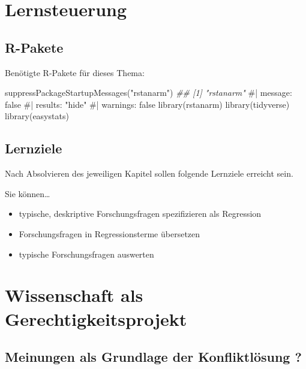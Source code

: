 \documentclass[
  a4paper,
  DIV=11]{scrreprt}
\newenvironment{Shaded}{\begin{snugshade}}{\end{snugshade}}
\newcommand{\CommentTok}[1]{\textcolor[rgb]{0.37,0.37,0.37}{#1}}
\newcommand{\DocumentationTok}[1]{\textcolor[rgb]{0.37,0.37,0.37}{\textit{#1}}}
\newcommand{\FunctionTok}[1]{\textcolor[rgb]{0.28,0.35,0.67}{#1}}
\newcommand{\NormalTok}[1]{\textcolor[rgb]{0.00,0.23,0.31}{#1}}
\newcommand{\StringTok}[1]{\textcolor[rgb]{0.13,0.47,0.30}{#1}}
\providecommand{\tightlist}{%
  \setlength{\itemsep}{0pt}\setlength{\parskip}{0pt}}\usepackage{longtable,booktabs,array}
\theoremstyle{definition}
\theoremstyle{remark}
\begin{document}
\hypertarget{lernsteuerung-8}{%
\section{Lernsteuerung}\label{lernsteuerung-8}}

\hypertarget{r-pakete}{%
\subsection{R-Pakete}\label{r-pakete}}

Benötigte R-Pakete für dieses Thema:

\begin{Shaded}
\begin{Highlighting}[]
\FunctionTok{suppressPackageStartupMessages}\NormalTok{(}\StringTok{"rstanarm"}\NormalTok{)}
\DocumentationTok{\#\# [1] "rstanarm"}
\CommentTok{\#| message: false}
\CommentTok{\#| results: "hide"}
\CommentTok{\#| warnings: false}
\FunctionTok{library}\NormalTok{(rstanarm)}
\FunctionTok{library}\NormalTok{(tidyverse)}
\FunctionTok{library}\NormalTok{(easystats)}
\end{Highlighting}
\end{Shaded}

\hypertarget{lernziele-9}{%
\subsection{Lernziele}\label{lernziele-9}}

Nach Absolvieren des jeweiligen Kapitel sollen folgende Lernziele
erreicht sein.

Sie können\ldots{}

\begin{itemize}
\tightlist
\item
  typische, deskriptive Forschungsfragen spezifizieren als Regression
\item
  Forschungsfragen in Regressionsterme übersetzen
\item
  typische Forschungsfragen auswerten
\end{itemize}

\hypertarget{wissenschaft-als-gerechtigkeitsprojekt}{%
\section{Wissenschaft als
Gerechtigkeitsprojekt}\label{wissenschaft-als-gerechtigkeitsprojekt}}

\hypertarget{meinungen-als-grundlage-der-konfliktluxf6sung}{%
\subsection{Meinungen als Grundlage der Konfliktlösung
?}\label{meinungen-als-grundlage-der-konfliktluxf6sung}}
\end{document}
